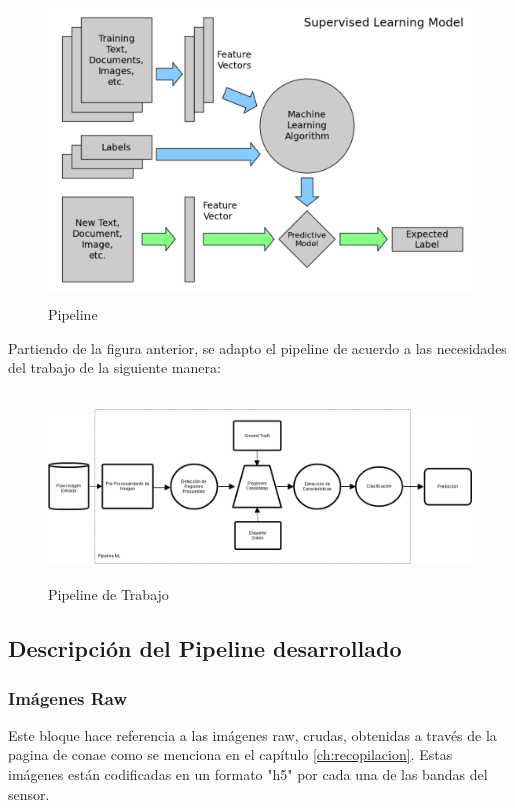 \begin{figure}[H] \centering
  \includegraphics[height=8cm,keepaspectratio=true,clip=true]{imagenes/tbd/pipeline-sp.png}
  \caption{Pipeline}\label{Fig:pipeline}
\end{figure}

Partiendo de la figura anterior, se adapto el pipeline de acuerdo a las necesidades del trabajo de la siguiente manera:

\begin{figure}[H] \centering
  \includegraphics[height=5cm,keepaspectratio=true,clip=true]{imagenes/tbd/pipeline.png}
  \caption{Pipeline de Trabajo}\label{Fig:pipeline-mio}
\end{figure}

\subsection{Descripción del Pipeline desarrollado}\label{sub:desc-pipeline}

\subsubsection*{Imágenes Raw}
Este bloque hace referencia a las imágenes raw, crudas, obtenidas a través de la pagina de \ac{conae} como se menciona en el capítulo \ref{ch:recopilacion}. Estas imágenes están codificadas en un formato "h5" por cada una de las bandas del sensor.

